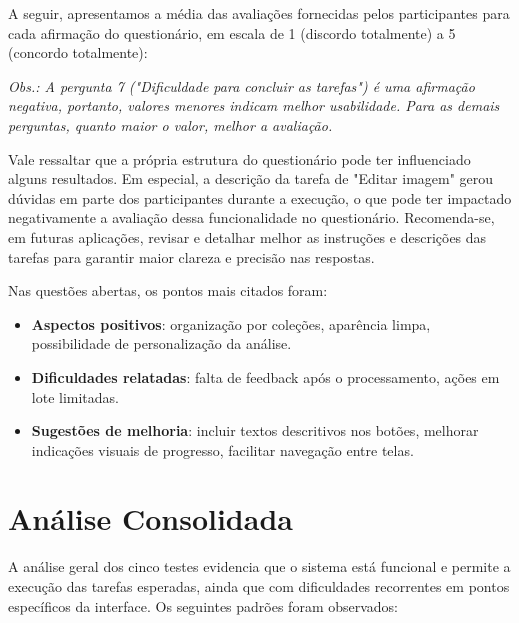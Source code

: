 A seguir, apresentamos a média das avaliações fornecidas pelos participantes para cada afirmação do questionário, em escala de 1 (discordo totalmente) a 5 (concordo totalmente):



\textit{Obs.: A pergunta 7 ("Dificuldade para concluir as tarefas") é uma afirmação negativa, portanto, valores menores indicam melhor usabilidade. Para as demais perguntas, quanto maior o valor, melhor a avaliação.}

Vale ressaltar que a própria estrutura do questionário pode ter influenciado alguns resultados. Em especial, a descrição da tarefa de "Editar imagem" gerou dúvidas em parte dos participantes durante a execução, o que pode ter impactado negativamente a avaliação dessa funcionalidade no questionário. Recomenda-se, em futuras aplicações, revisar e detalhar melhor as instruções e descrições das tarefas para garantir maior clareza e precisão nas respostas.

Nas questões abertas, os pontos mais citados foram:

\begin{itemize}
    \item \textbf{Aspectos positivos}: organização por coleções, aparência limpa, possibilidade de personalização da análise.
    \item \textbf{Dificuldades relatadas}: falta de feedback após o processamento, ações em lote limitadas.
    \item \textbf{Sugestões de melhoria}: incluir textos descritivos nos botões, melhorar indicações visuais de progresso, facilitar navegação entre telas.
\end{itemize}

\section{Análise Consolidada}

A análise geral dos cinco testes evidencia que o sistema está funcional e permite a execução das tarefas esperadas, ainda que com dificuldades recorrentes em pontos específicos da interface. Os seguintes padrões foram observados:

